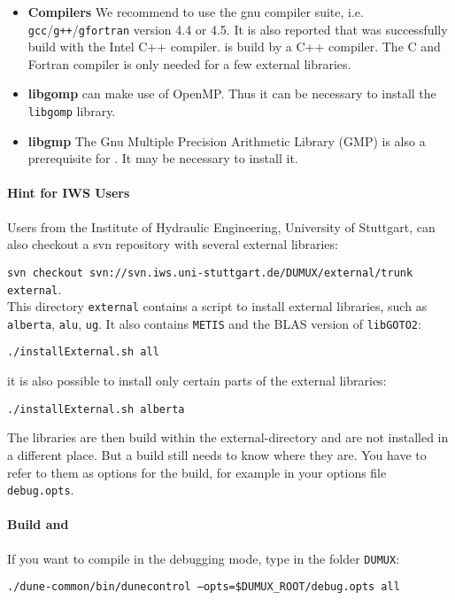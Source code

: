 \begin{itemize}
\item \textbf{Compilers} We recommend to use the gnu compiler suite, i.e. \texttt{gcc}/\texttt{g++}/\texttt{gfortran} version 4.4 or 4.5. It is also reported that \Dune was successfully build with the Intel C++ compiler. \Dune is build by a C++ compiler. The C and Fortran compiler is only needed for a few external libraries.

\item \textbf{libgomp} \Dune can make use of OpenMP. Thus it can be necessary to install the \texttt{libgomp} library.

\item \textbf{libgmp} The Gnu Multiple Precision Arithmetic Library (GMP) is also a prerequisite for \Dune. It may be necessary to install it.
\end{itemize}

\paragraph{Hint for IWS Users} Users from the Institute of Hydraulic Engineering, University of Stuttgart,
can also checkout a svn repository with several external libraries: 

\texttt{svn checkout svn://svn.iws.uni-stuttgart.de/DUMUX/external/trunk external}. \\

This directory \texttt{external} contains a script to install external libraries, such as 
\texttt{alberta}, \texttt{alu}, \texttt{ug}. It also contains \texttt{METIS} and the BLAS version of \texttt{libGOTO2}: 
\begin{center}
\texttt{./installExternal.sh all}
\end{center}
it is also possible to install only certain parts of the external libraries:
\begin{center}
\texttt{./installExternal.sh alberta}
\end{center}

The libraries are then build within the external-directory and are not installed in a different place. But a \Dune build still needs to know where they are. You have to refer to them as options for the \Dune build, for example in your options file \texttt{debug.opts}.


\paragraph{Build \Dune and \Dumux}
\label{buildIt}
If you want to compile in the debugging mode, type in the folder \texttt{DUMUX}: 
\begin{center}
\texttt{./dune-common/bin/dunecontrol --opts=\$DUMUX\_ROOT/debug.opts all}
\end{center}

